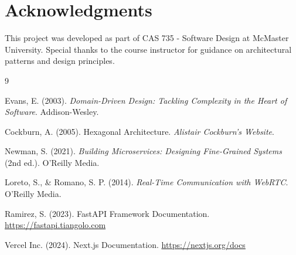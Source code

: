 \documentclass[12pt,a4paper]{article}
\begin{document}
\section*{Acknowledgments}

This project was developed as part of CAS 735 - Software Design at McMaster University. Special thanks to the course instructor for guidance on architectural patterns and design principles.

\begin{thebibliography}{9}

Evans, E. (2003). \textit{Domain-Driven Design: Tackling Complexity in the Heart of Software}. Addison-Wesley.

Cockburn, A. (2005). Hexagonal Architecture. \textit{Alistair Cockburn's Website}.

Newman, S. (2021). \textit{Building Microservices: Designing Fine-Grained Systems} (2nd ed.). O'Reilly Media.

Loreto, S., \& Romano, S. P. (2014). \textit{Real-Time Communication with WebRTC}. O'Reilly Media.

Ramirez, S. (2023). FastAPI Framework Documentation. \url{https://fastapi.tiangolo.com}

Vercel Inc. (2024). Next.js Documentation. \url{https://nextjs.org/docs}

\end{thebibliography}
\end{document}
